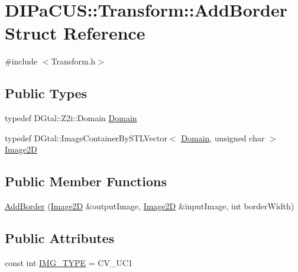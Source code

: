 \hypertarget{structDIPaCUS_1_1Transform_1_1AddBorder}{}\section{D\+I\+Pa\+C\+US\+:\+:Transform\+:\+:Add\+Border Struct Reference}
\label{structDIPaCUS_1_1Transform_1_1AddBorder}


{\ttfamily \#include $<$Transform.\+h$>$}

\subsection*{Public Types}
\begin{DoxyCompactItemize}
\item 
typedef D\+Gtal\+::\+Z2i\+::\+Domain \mbox{\hyperlink{structDIPaCUS_1_1Transform_1_1AddBorder_aa878a2be182e363252fc780e3e943107}{Domain}}
\item 
typedef D\+Gtal\+::\+Image\+Container\+By\+S\+T\+L\+Vector$<$ \mbox{\hyperlink{structDIPaCUS_1_1Transform_1_1AddBorder_aa878a2be182e363252fc780e3e943107}{Domain}}, unsigned char $>$ \mbox{\hyperlink{structDIPaCUS_1_1Transform_1_1AddBorder_afc1095eded4646df5be042cfe0a9c20a}{Image2D}}
\end{DoxyCompactItemize}
\subsection*{Public Member Functions}
\begin{DoxyCompactItemize}
\item 
\mbox{\hyperlink{structDIPaCUS_1_1Transform_1_1AddBorder_a920374f7331bc108bf8d5e1cabe3c83d}{Add\+Border}} (\mbox{\hyperlink{structDIPaCUS_1_1Transform_1_1AddBorder_afc1095eded4646df5be042cfe0a9c20a}{Image2D}} \&output\+Image, \mbox{\hyperlink{structDIPaCUS_1_1Transform_1_1AddBorder_afc1095eded4646df5be042cfe0a9c20a}{Image2D}} \&input\+Image, int border\+Width)
\end{DoxyCompactItemize}
\subsection*{Public Attributes}
\begin{DoxyCompactItemize}
\item 
const int \mbox{\hyperlink{structDIPaCUS_1_1Transform_1_1AddBorder_a90d789c0649b9c0e299b7ebf374c5c57}{I\+M\+G\+\_\+\+T\+Y\+PE}} = C\+V\+\_\+U\+C1
\end{DoxyCompactItemize}


